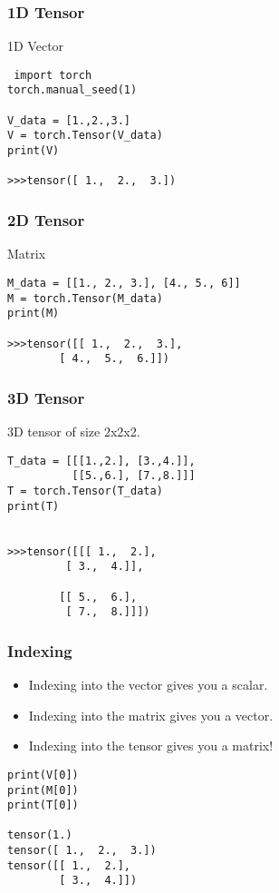 \begin{frame}[fragile]
\frametitle{1D Tensor}
1D Vector
 \begin{lstlisting}
 import torch
torch.manual_seed(1)

V_data = [1.,2.,3.]
V = torch.Tensor(V_data)
print(V)

>>>tensor([ 1.,  2.,  3.])
 \end{lstlisting}

 \end{frame} 


 
\begin{frame}[fragile]
\frametitle{2D Tensor}
Matrix 
 \begin{lstlisting}
M_data = [[1., 2., 3.], [4., 5., 6]]
M = torch.Tensor(M_data)
print(M)

>>>tensor([[ 1.,  2.,  3.],
        [ 4.,  5.,  6.]])
 \end{lstlisting}

 \end{frame} 

 
\begin{frame}[fragile]
\frametitle{3D Tensor}
3D tensor of size 2x2x2.
 \begin{lstlisting}
T_data = [[[1.,2.], [3.,4.]],
          [[5.,6.], [7.,8.]]]
T = torch.Tensor(T_data)
print(T)


>>>tensor([[[ 1.,  2.],
         [ 3.,  4.]],

        [[ 5.,  6.],
         [ 7.,  8.]]])
 \end{lstlisting}

 \end{frame} 

\begin{frame}[fragile]
\frametitle{Indexing}
\begin{itemize}
\item Indexing into the vector gives you a scalar. 
\item Indexing into the matrix gives you a vector. 
\item Indexing into the tensor gives you a matrix!
\end{itemize}

 \begin{lstlisting}
print(V[0])
print(M[0])
print(T[0])

tensor(1.)
tensor([ 1.,  2.,  3.])
tensor([[ 1.,  2.],
        [ 3.,  4.]])
 \end{lstlisting}

 \end{frame} 
 
